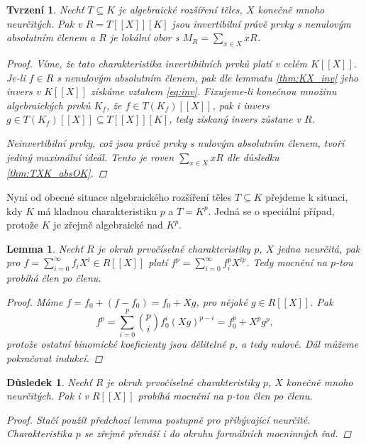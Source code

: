\documentclass[11pt,a4paper]{article}
\newcommand*{\mld}[1]{\[#1\]} %
\newcounter{numb}
\theoremstyle{definition}
\theoremstyle{plain}
\newtheorem{lemma}[numb]{Lemma}
\newtheorem{tvrzeni}[numb]{Tvrzení}
\newtheorem{dusledek}[numb]{Důsledek}
\begin{document}
\begin{tvrzeni}
	Nechť $T \subseteq K$ je algebraické rozšíření těles, $X$ konečně mnoho neurčitých. Pak v $R = T[[X]][K]$ jsou invertibilní právě prvky s nenulovým absolutním členem a $R$ je lokální obor s $M_R = \sum_{x \in X} xR$.

	\begin{proof}
		Víme, že tato charakteristika invertibilních prvků platí v celém $K[[X]]$. Je-li $f \in R$ s nenulovým absolutním členem, pak dle lemmatu \ref{thm:KX_inv} jeho invers v $K[[X]]$ získáme vztahem \eqref{eq:inv}. Fixujeme-li konečnou množinu algebraických prvků $K_f$, že $f \in T(K_f)[[X]]$, pak i invers $g \in T(K_f)[[X]] \subseteq T[[X]][K]$, tedy získaný invers zůstane v $R$.

		Neinvertibilní prvky, což jsou právě prvky s nulovým absolutním členem, tvoří jediný maximální ideál. Tento je roven $\sum_{x \in X} x R$ dle důsledku \ref{thm:TXK_absOK}.
	\end{proof}
\end{tvrzeni}

Nyní od obecné situace algebraického rozšíření těles $T \subseteq K$ přejdeme k situaci, kdy $K$ má kladnou charakteristiku $p$ a $T = K^p$. Jedná se o speciální případ, protože $K$ je zřejmě algebraické nad $K^p$.

\begin{lemma}
	Nechť $R$ je okruh prvočíselné charakteristiky $p$, $X$ jedna neurčitá, pak pro $f = \sum_{i = 0}^\infty f_i X^i \in R[[X]]$ platí $f^p = \sum_{i = 0}^\infty f_i^p X^{ip}$. Tedy mocnění na $p$-tou probíhá člen po členu.

	\begin{proof}
		Máme $f = f_0 + (f - f_0) = f_0 + X g$, pro nějaké $g \in R[[X]]$. Pak
		\mld{
			f^p = \sum_{i = 0}^p \binom{p}{i} f_0^i (X g)^{p - i} = f_0^p + X^p g^p,
		}
		protože ostatní binomické koeficienty jsou dělitelné $p$, a tedy nulové. Dál můžeme pokračovat indukcí.
	\end{proof}
\end{lemma}

\begin{dusledek} \label{thm:p_power}
	Nechť $R$ je okruh prvočíselné charakteristiky $p$, $X$ konečně mnoho neurčitých. Pak i v $R[[X]]$ probíhá mocnění na $p$-tou člen po členu.

	\begin{proof}
		Stačí použít předchozí lemma postupně pro přibývající neurčité. Charakteristika $p$ se zřejmě přenáší i do okruhu formálních mocninných řad.
	\end{proof}
\end{dusledek}
\end{document}
